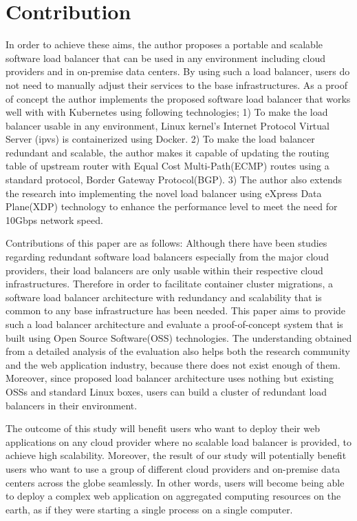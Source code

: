 \section{Contribution}

In order to achieve these aims, the author proposes a portable and scalable software load balancer that can be used in any environment including cloud providers and in on-premise data centers.
By using such a load balancer, users do not need to manually adjust their services to the base infrastructures.
As a proof of concept the author implements the proposed software load balancer that works well with with Kubernetes using following technologies;
1) To make the load balancer usable in any environment, Linux kernel's Internet Protocol Virtual Server (ipvs)\cite{Zhang2000} is containerized using Docker\cite{merkel2014docker}. 
2) To make the load balancer redundant and scalable, the author makes it capable of updating the routing table of upstream router with Equal Cost Multi-Path(ECMP) routes\cite{al2008scalable} using a standard protocol, Border Gateway Protocol(BGP).
3) The author also extends the research into implementing the novel load balancer using eXpress Data Plane(XDP) technology\cite{bertin2017xdp} to enhance the performance level to meet the need for 10Gbps network speed.

Contributions of this paper are as follows:
Although there have been studies regarding redundant software load balancers especially from the major cloud providers\cite{eisenbud2016maglev,patel2013ananta}, their load balancers are only usable within their respective cloud infrastructures.
Therefore in order to facilitate container cluster migrations, a software load balancer architecture with redundancy and scalability that is common to any base infrastructure has been needed.
This paper aims to provide such a load balancer architecture and evaluate a proof-of-concept system that is built using Open Source Software(OSS) technologies.
The understanding obtained from a detailed analysis of the evaluation also helps both the research community and the web application industry, because there does not exist enough of them.
Moreover, since proposed load balancer architecture uses nothing but existing OSSs and standard Linux boxes, users can build a cluster of redundant load balancers in their environment.

The outcome of this study will benefit users who want to deploy their web applications on any cloud provider where no scalable load balancer is provided, to achieve high scalability.
Moreover, the result of our study will potentially benefit users who want to use a group of different cloud providers and on-premise data centers across the globe seamlessly.
In other words, users will become being able to deploy a complex web application on aggregated computing resources on the earth, as if they were starting a single process on a single computer.

